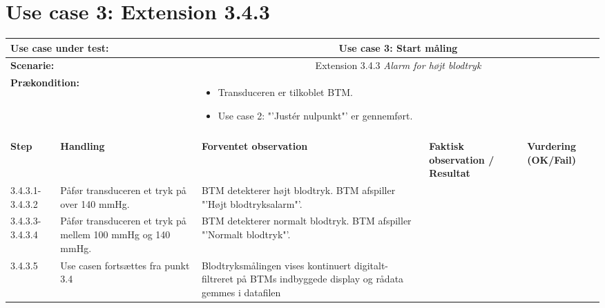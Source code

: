 \section{Use case 3: Extension 3.4.3}
\begin{tabular}{|p{1cm}|p{3cm}|p{4cm}|p{4cm}|p{2cm}|}
\hline
\multicolumn{2}{|p{3cm}|}{\textbf{Use case under test:}} & \multicolumn{3}{c|}{Use case 3: Start måling} \\\hline

\multicolumn{2}{|p{3cm}|}{\textbf{Scenarie:}} & \multicolumn{3}{c|}{Extension 3.4.3 \textit{Alarm for højt blodtryk}} \\\hline

\multicolumn{2}{|p{3cm}|}{\textbf{Prækondition:}}  & \multicolumn{3}{l|}{\parbox{0.6\textwidth}{
\begin{itemize}[label=$\circ$]
\item Transduceren er tilkoblet BTM.
\item Use case 2: "'Justér nulpunkt"' er gennemført.  
\end{itemize} }}\\\hline

\multicolumn{5}{|c|}{} \\\hline

\textbf{Step} & \textbf{Handling} & \textbf{Forventet observation} & \textbf{Faktisk observation / Resultat} & \textbf{Vurdering (OK/Fail)}\\\hline

3.4.3.1-3.4.3.2 & Påfør transduceren et tryk på over 140 mmHg. & BTM detekterer højt blodtryk. BTM afspiller "'Højt blodtryksalarm"'.  & & 
\\\hline
3.4.3.3-3.4.3.4 & Påfør transduceren et tryk på mellem 100 mmHg og 140 mmHg. & BTM detekterer normalt blodtryk. BTM afspiller "'Normalt blodtryk"'.  & & 
\\\hline
3.4.3.5 & Use casen fortsættes fra punkt 3.4 & Blodtryksmålingen vises kontinuert digitalt-filtreret på BTMs indbyggede display og rådata gemmes i datafilen & & 
\\\hline

\end{tabular}

